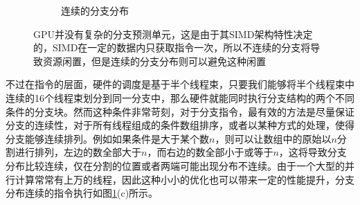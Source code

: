 \begin{figure}
\begin{fullwidth}
\begin{subfigure}[b]{0.51\thewidth}
		\caption{连续的分支分布}
	\end{subfigure}
\caption{GPU并没有复杂的分支预测单元，这是由于其SIMD架构特性决定的，SIMD在一定的数据内只获取指令一次，所以不连续的分支将导致资源闲置，但是连续的分支分布则可以避免这种闲置}
\label{f:rp-branching}
\end{fullwidth}
\end{figure}

不过在指令的层面，硬件的调度是基于半个线程束，只要我们能够将半个线程束中连续的16个线程束划分到同一分支中，那么硬件就能同时执行分支结构的两个不同条件的分支块。然而这种条件非常苛刻，对于分支指令，最有效的方法是尽量保证分支的连续性，对于所有线程组成的条件数组排序，或者以某种方式的处理，使得分支能够连续排列。例如如果条件是大于某个数$n$，则可以让数组中的原始以$n$分割进行排列，左边的数全部大于$n$，而右边的数全部小于或等于$n$，这将导致分支分布比较连续，仅在分割的位置或者两端可能出现分布不连续。由于一个大型的并行计算常常有上万的线程，因此这种小小的优化也可以带来一定的性能提升，分支分布连续的指令执行如图\ref{f:rp-branching}(c)所示。


